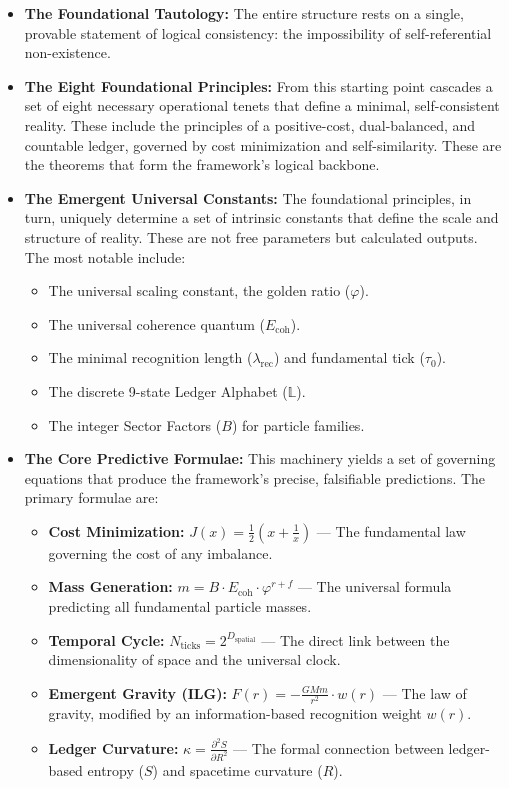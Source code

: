 \begin{itemize}
    \item \textbf{The Foundational Tautology:} The entire structure rests on a single, provable statement of logical consistency: the impossibility of self-referential non-existence.

    \item \textbf{The Eight Foundational Principles:} From this starting point cascades a set of eight necessary operational tenets that define a minimal, self-consistent reality. These include the principles of a positive-cost, dual-balanced, and countable ledger, governed by cost minimization and self-similarity. These are the theorems that form the framework's logical backbone.

    \item \textbf{The Emergent Universal Constants:} The foundational principles, in turn, uniquely determine a set of intrinsic constants that define the scale and structure of reality. These are not free parameters but calculated outputs. The most notable include:
    \begin{itemize}
        \item The universal scaling constant, the golden ratio (\(\varphi\)).
        \item The universal coherence quantum (\(E_{\text{coh}}\)).
        \item The minimal recognition length (\(\lambda_{\text{rec}}\)) and fundamental tick (\(\tau_0\)).
        \item The discrete 9-state Ledger Alphabet (\(\mathbb{L}\)).
        \item The integer Sector Factors (\(B\)) for particle families.
    \end{itemize}

    \item \textbf{The Core Predictive Formulae:} This machinery yields a set of governing equations that produce the framework's precise, falsifiable predictions. The primary formulae are:
    \begin{itemize}
        \item \textbf{Cost Minimization:} \(J(x) = \frac{1}{2}(x + \frac{1}{x})\) — The fundamental law governing the cost of any imbalance.
        \item \textbf{Mass Generation:} \(m = B \cdot E_{\text{coh}} \cdot \varphi^{r + f}\) — The universal formula predicting all fundamental particle masses.
        \item \textbf{Temporal Cycle:} \(N_{\text{ticks}} = 2^{D_{\text{spatial}}}\) — The direct link between the dimensionality of space and the universal clock.
        \item \textbf{Emergent Gravity (ILG):} \(F(r) = - \frac{GMm}{r^2} \cdot w(r)\) — The law of gravity, modified by an information-based recognition weight \(w(r)\).
        \item \textbf{Ledger Curvature:} \(\kappa = \frac{\partial^2 S}{\partial R^2}\) — The formal connection between ledger-based entropy (\(S\)) and spacetime curvature (\(R\)).
    \end{itemize}
\end{itemize}
